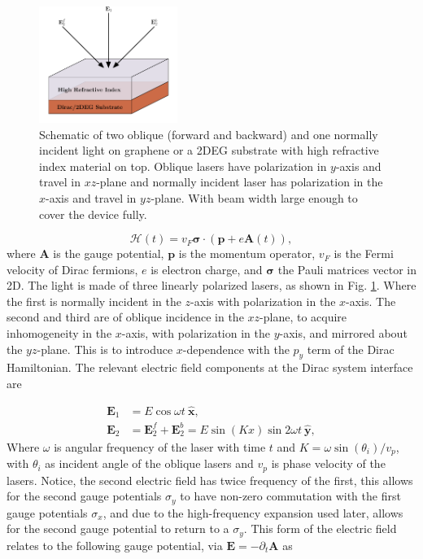 \documentclass[aps,prb,twocolumn,showpacs,superscriptaddress]{revtex4-2}
\let\oldhat\hat
\renewcommand{\hat}[1]{\oldhat{\mathbf{#1}}}
\renewcommand{\vec}[1]{\mathbf{#1}}
\newcommand{\ham}{\mathcal{H}}
\begin{document}
\begin{figure}[h]
  \includegraphics[width=0.4\textwidth]{./figures/fll-setup.pdf}
  \caption{Schematic of two oblique (forward and backward) and one normally incident light on graphene or a 2DEG substrate with high refractive index material on top. Oblique lasers have polarization in $y$-axis and travel in $xz$-plane and normally incident laser has polarization in the $x$-axis and travel in $yz$-plane. With beam width large enough to cover the device fully.}
  \label{fig:fll-setup}
\end{figure}

\begin{equation}\label{eq:HDirac}
  \ham(t) = v_{F} \bm{\sigma} \cdot \left(\vec{p} + e\vec{A}(t)\right),
\end{equation}
where $\vec{A}$ is the gauge potential, $\vec{p}$ is the momentum operator, $v_F$ is the Fermi velocity of Dirac fermions, $e$ is electron charge, and $\vec{\sigma}$ the Pauli matrices vector in 2D.
The light is made of three linearly polarized lasers, as shown in Fig. \ref{fig:fll-setup}.
Where the first is normally incident in the $z$-axis with polarization in the $x$-axis.
The second and third are of oblique incidence in the $xz$-plane, to acquire inhomogeneity in the $x$-axis, with polarization in the $y$-axis, and mirrored about the $yz$-plane.
This is to introduce $x$-dependence with the $p_y$ term of the Dirac Hamiltonian.
The relevant electric field components at the Dirac system interface are

\begin{align} \label{eq:EDfield}
\vec{E}_{1} &= E\cos \omega t\ \hat{x}, \nonumber \\
\vec{E}_{2} &= \vec{E}_2^f + \vec{E}_2^b = E\sin(Kx)\sin 2\omega t\ \hat{y},
\end{align}
Where $\omega$ is angular frequency of the laser with time $t$ and $K = \omega \sin{(\theta_i)} / v_p$, with $\theta_i$ as incident angle of the oblique lasers and $v_p$ is phase velocity of the lasers.
Notice, the second electric field has twice frequency of the first, this allows for the second gauge potentials $\sigma_y$ to have non-zero commutation with the first gauge potentials $\sigma_x$, and due to the high-frequency expansion used later, allows for the second gauge potential to return to a $\sigma_y$.
This form of the electric field relates to the following gauge potential, via $\vec{E} = -\partial_t \vec{A}$ as
\end{document}
